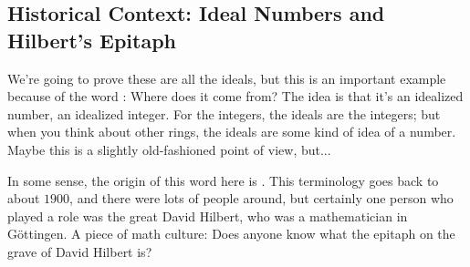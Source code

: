 \begin{content}


\end{content}

\subsection{Historical Context: Ideal Numbers and Hilbert's Epitaph}

\begin{speech}[00:49:02 - 00:49:48]
We're going to prove these are all the ideals, but this is an important example because of the word : Where does it come from? The idea is that it's an idealized number, an idealized integer. For the integers, the ideals are the integers; but when you think about other rings, the ideals are some kind of idea of a number. Maybe this is a slightly old-fashioned point of view, but...

In some sense, the origin of this word  here is . This terminology goes back to about $1900$, and there were lots of people around, but certainly one person who played a role was the great David Hilbert, who was a mathematician in Göttingen. A piece of math culture: Does anyone know what the epitaph on the grave of David Hilbert is?
\end{speech}

